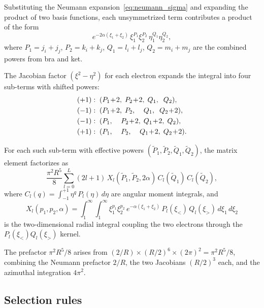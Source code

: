 \documentclass[aps,pra,twocolumn,superscriptaddress,longbibliography]{revtex4-2}
\begin{document}
Substituting the Neumann expansion~\eqref{eq:neumann_sigma}
and expanding the product of two basis functions, each
unsymmetrized term contributes a product of the form
\begin{equation}
  e^{-2\alpha(\xi_1+\xi_2)}\,\xi_1^{P_1}\xi_2^{P_2}\,
  \eta_1^{Q_1}\eta_2^{Q_2},
\end{equation}
where $P_1 = j_i + j_j$, $P_2 = k_i + k_j$,
$Q_1 = l_i + l_j$, $Q_2 = m_i + m_j$ are the combined
powers from bra and ket.

The Jacobian factor $(\xi^2 - \eta^2)$ for each electron
expands the integral into four sub-terms with shifted powers:
\begin{align}
  &(+1):\; (P_1\!+\!2,\; P_2\!+\!2,\; Q_1,\;\; Q_2), \notag\\
  &(-1):\; (P_1\!+\!2,\; P_2,\;\;\;\; Q_1,\;\; Q_2\!+\!2), \notag\\
  &(-1):\; (P_1,\;\;\;\; P_2\!+\!2,\; Q_1\!+\!2,\; Q_2), \notag\\
  &(+1):\; (P_1,\;\;\;\; P_2,\;\;\;\; Q_1\!+\!2,\; Q_2\!+\!2).
  \label{eq:jacobian_expansion}
\end{align}

For each such sub-term with effective powers
$(\tilde{P}_1, \tilde{P}_2, \tilde{Q}_1, \tilde{Q}_2)$,
the matrix element factorizes as
\begin{equation}
  \frac{\pi^2 R^5}{8}\sum_{l=0}^{L}(2l+1)\,
  X_l(\tilde{P}_1, \tilde{P}_2, 2\alpha)\,
  C_l(\tilde{Q}_1)\,C_l(\tilde{Q}_2),
  \label{eq:factorized}
\end{equation}
where $C_l(q) = \int_{-1}^{+1}\eta^q\,P_l(\eta)\,d\eta$ are
angular moment integrals, and
\begin{equation}
  X_l(p_1, p_2, \alpha) = \int_1^\infty\!\!\int_1^\infty
    \xi_1^{p_1}\xi_2^{p_2}\,e^{-\alpha(\xi_1+\xi_2)}\,
    P_l(\xi_<)\,Q_l(\xi_>)\,d\xi_1\,d\xi_2
  \label{eq:Xl_def}
\end{equation}
is the two-dimensional radial integral coupling the two
electrons through the $P_l(\xi_<) Q_l(\xi_>)$ kernel.

The prefactor $\pi^2 R^5/8$ arises from
$(2/R) \times (R/2)^6 \times (2\pi)^2 = \pi^2 R^5/8$,
combining the Neumann prefactor $2/R$, the two Jacobians
$(R/2)^3$ each, and the azimuthal integration $4\pi^2$.

\subsection{Selection rules}
\end{document}
